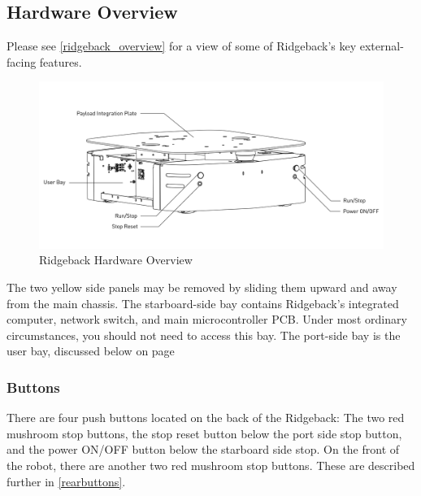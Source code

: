 \documentclass[]{clearpath-latex/clearpath-manual}
\begin{document}
\pagebreak[4]
\subsection{Hardware Overview}

Please see \autoref{ridgeback_overview} for a view of some of Ridgeback's key external-facing features.

\begin{figure}[h]
  \centering
  \includegraphics[width=1\linewidth]{Ridgeback_Rear_Drawing_Labeled.pdf}
  \caption{Ridgeback Hardware Overview}
  \label{ridgeback_overview}
\end{figure}

The two yellow side panels may be removed by sliding them upward and away from the main chassis. The starboard-side bay contains Ridgeback's integrated computer, network switch, and main microcontroller PCB. Under most ordinary circumstances, you should not need to access this bay. The port-side bay is the user bay, discussed below on page \pageref{userbay}


\pagebreak[4]
\subsubsection{Buttons}

There are four push buttons located on the back of the Ridgeback: The two red mushroom stop buttons, the stop reset button below the port side stop button, and the power ON/OFF button below the starboard side stop. On the front of the robot, there are another two red mushroom stop buttons.  These are described further in \autoref{rearbuttons}.
\end{document}
